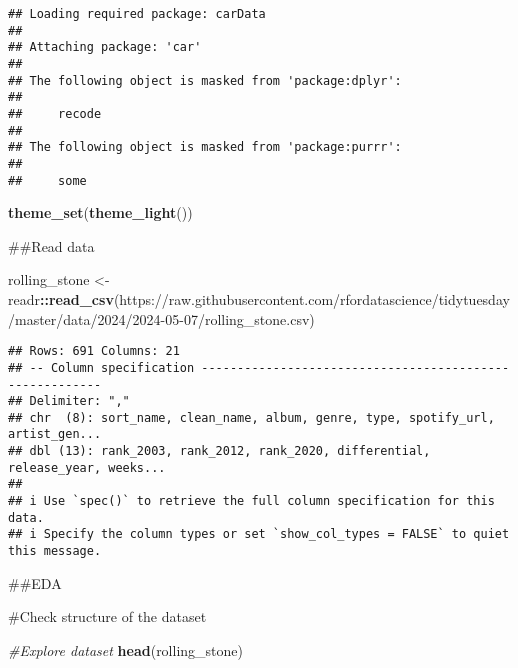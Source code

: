 \documentclass[
]{article}
\newenvironment{Shaded}{\begin{snugshade}}{\end{snugshade}}
\newcommand{\CommentTok}[1]{\textcolor[rgb]{0.56,0.35,0.01}{\textit{#1}}}
\newcommand{\FunctionTok}[1]{\textcolor[rgb]{0.13,0.29,0.53}{\textbf{#1}}}
\newcommand{\NormalTok}[1]{#1}
\newcommand{\OtherTok}[1]{\textcolor[rgb]{0.56,0.35,0.01}{#1}}
\newcommand{\SpecialCharTok}[1]{\textcolor[rgb]{0.81,0.36,0.00}{\textbf{#1}}}
\newcommand{\StringTok}[1]{\textcolor[rgb]{0.31,0.60,0.02}{#1}}
\begin{document}
\begin{verbatim}
## Loading required package: carData
## 
## Attaching package: 'car'
## 
## The following object is masked from 'package:dplyr':
## 
##     recode
## 
## The following object is masked from 'package:purrr':
## 
##     some
\end{verbatim}

\begin{Shaded}
\begin{Highlighting}[]
\FunctionTok{theme\_set}\NormalTok{(}\FunctionTok{theme\_light}\NormalTok{())}
\end{Highlighting}
\end{Shaded}

\#\#Read data

\begin{Shaded}
\begin{Highlighting}[]
\NormalTok{rolling\_stone }\OtherTok{\textless{}{-}}\NormalTok{ readr}\SpecialCharTok{::}\FunctionTok{read\_csv}\NormalTok{(}\StringTok{\textquotesingle{}https://raw.githubusercontent.com/rfordatascience/tidytuesday/master/data/2024/2024{-}05{-}07/rolling\_stone.csv\textquotesingle{}}\NormalTok{)}
\end{Highlighting}
\end{Shaded}

\begin{verbatim}
## Rows: 691 Columns: 21
## -- Column specification --------------------------------------------------------
## Delimiter: ","
## chr  (8): sort_name, clean_name, album, genre, type, spotify_url, artist_gen...
## dbl (13): rank_2003, rank_2012, rank_2020, differential, release_year, weeks...
## 
## i Use `spec()` to retrieve the full column specification for this data.
## i Specify the column types or set `show_col_types = FALSE` to quiet this message.
\end{verbatim}

\#\#EDA

\#Check structure of the dataset

\begin{Shaded}
\begin{Highlighting}[]
\CommentTok{\#Explore dataset}
\FunctionTok{head}\NormalTok{(rolling\_stone)}
\end{Highlighting}
\end{Shaded}
\end{document}
